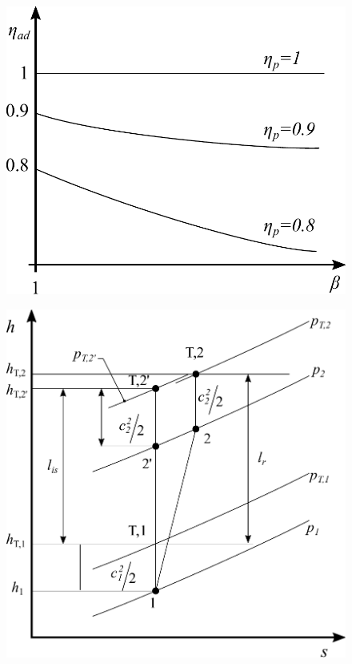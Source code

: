\begin{figure}
\centering
\begin{minipage}{.45\textwidth}
  \centering
  \includegraphics[width=.9\linewidth]{fig/Rend3.pdf}
  \label{fig:Rend3}
\end{minipage}%
\begin{minipage}{.55\textwidth}
  \centering
  \includegraphics[width=.9\linewidth]{fig/Rend4.pdf}
  \label{fig:Rend4}
\end{minipage}
\end{figure}
